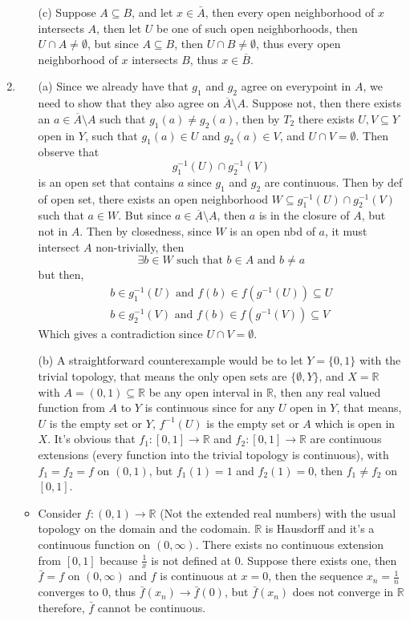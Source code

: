 \documentclass[12pt]{article}
\begin{document}
\begin{enumerate}
\begin{itemize}
			\item[(c)] Suppose $A \subseteq B$, and let $x \in \bar{A}$, then every open neighborhood of $x$ intersects $A$, then let $U$ be one of such open neighborhoods, then $U \cap A \neq \emptyset$, but since $A \subseteq B$, then $U \cap B \neq \emptyset$, thus every open neighborhood of $x$ intersects $B$, thus $x \in \overline{B}$. 
		\end{itemize}
	\item \begin{itemize}
			\item[(a)]Since we already have that $g_1$ and $g_2$ agree on everypoint in $A$, we need to show that they also agree on $\overline{A}\setminus{A}$. Suppose not, then there exists an $a \in \overline{A}\setminus A$ such that $g_1(a) \neq g_2(a)$, then by $T_2$ there exists $U, V \subseteq Y$ open in $Y$, such that $g_1(a) \in U$ and $g_2(a) \in V$, and $U \cap V = \emptyset$. Then observe that
		$$g_1^{-1}(U) \cap g_2^{-1}(V)$$ is an open set that contains $a$ since $g_1$ and $g_2$ are continuous. Then by def of open set, there exists an open neighborhood $W \subseteq g_1^{-1}(U) \cap g_2^{-1}(V)$ such that $a \in W$. But since $a \in \overline{A}\setminus{A}$, then $a$ is in the closure of $A$, but not in $A$. Then by closedness, since $W$ is an open nbd of $a$, it must intersect $A$ non-trivially, then
		$$ \exists b \in W \text{ such that } b \in A \text{ and } b \neq a$$
		but then,
		\begin{align*}
			b \in g_1^{-1}(U) \text{ and } f(b) \in f(g^{-1}(U)) \subseteq U\\
			b \in g_2^{-1}(V) \text{ and } f(b) \in f(g^{-1}(V)) \subseteq V
		\end{align*}
		Which gives a contradiction since $U \cap V = \emptyset$.
\item[(b)] A straightforward counterexample would be to let $Y = \{0,1\}$ with the trivial topology, that means the only open sets are $\{\emptyset, Y \}$, and $X = \mathbb{R}$ with $A = (0,1) \subseteq \mathbb{R}$ be any open interval in $\mathbb{R}$, then any real valued function from $A$ to $Y$ is continuous since for any $U$ open in $Y$, that means, $U$ is the empty set or $Y$, $f^{-1}(U)$ is the empty set or $A$ which is open in $X$. It's obvious that $f_1 \colon [0,1] \to \mathbb{R}$ and $f_2 \colon [0,1] \to \mathbb{R}$ are continuous extensions (every function into the trivial topology is continuous), with $f_1 = f_2 = f$ on $(0,1)$, but $f_1(1) = 1$ and $f_2(1) = 0$, then $f_1 \neq f_2$ on $[0,1]$. 
\item Consider $f \colon (0,1) \to \mathbb{R}$ (Not the extended real numbers) with the usual topology on the domain and the codomain. $\mathbb{R}$ is Hausdorff and it's a continuous function on $(0,\infty)$. There exists no continuous extension from $[0,1]$ because $\frac{1}{x}$ is not defined at $0$. Suppose there exists one, then $\bar{f} = f$ on $(0,\infty)$ and $f$ is continuous at $x =0$, then the sequence $x_n = \frac{1}{n}$ converges to $0$, thus $\bar{f}(x_n) \to \bar{f}(0)$, but $\bar{f}(x_n)$ does not converge in $\mathbb{R}$ therefore, $\bar{f}$ cannot be continuous.


\end{itemize}
\end{enumerate}
\end{document}
